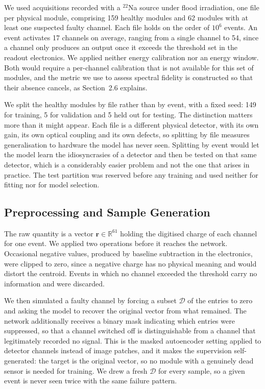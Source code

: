 \documentclass[10pt,conference]{IEEEtran}
\begin{document}
We used acquisitions recorded with a $^{22}$Na source under flood irradiation,
one file per physical module, comprising 159 healthy modules and 62 modules
with at least one suspected faulty channel. Each file holds on the order of
$10^6$ events. An event activates 17 channels on average, ranging from a single
channel to 54, since a channel only produces an output once it exceeds the
threshold set in the readout electronics. We applied neither energy calibration
nor an energy window. Both would require a per-channel calibration that is not
available for this set of modules, and the metric we use to assess spectral
fidelity is constructed so that their absence cancels, as
Section~2.6 explains.

We split the healthy modules by file rather than by event, with a fixed seed:
149 for training, 5 for validation and 5 held out for testing. The distinction
matters more than it might appear. Each file is a different physical detector,
with its own gain, its own optical coupling and its own defects, so splitting
by file measures generalisation to hardware the model has never seen. Splitting
by event would let the model learn the idiosyncrasies of a detector and then be
tested on that same detector, which is a considerably easier problem and not
the one that arises in practice. The test partition was reserved before any
training and used neither for fitting nor for model selection.

\subsection{Preprocessing and Sample Generation}
\label{sec:preproc}

The raw quantity is a vector $\mathbf{r} \in \mathbb{R}^{61}$ holding the
digitised charge of each channel for one event. We applied two operations
before it reaches the network. Occasional negative values, produced by baseline
subtraction in the electronics, were clipped to zero, since a negative charge
has no physical meaning and would distort the centroid. Events in which no
channel exceeded the threshold carry no information and were discarded.

We then simulated a faulty channel by forcing a subset $\mathcal{D}$ of the
entries to zero and asking the model to recover the original vector from what
remained. The network additionally receives a binary mask indicating which
entries were suppressed, so that a channel switched off is distinguishable from
a channel that legitimately recorded no signal. This is the masked autoencoder
setting \cite{he2022mae} applied to detector channels instead of image patches,
and it makes the supervision self-generated: the target is the original vector,
so no module with a genuinely dead sensor is needed for training. We drew a
fresh $\mathcal{D}$ for every sample, so a given event is never seen twice with
the same failure pattern.
\end{document}
